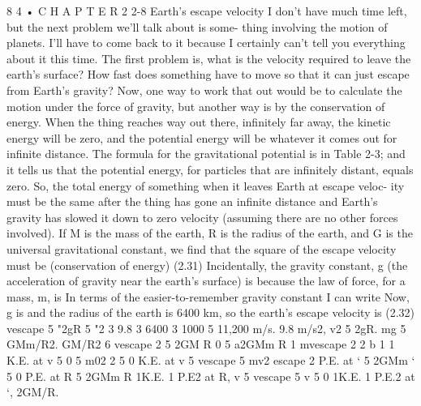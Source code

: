 \documentclass[10pt,oneside]{article}
\begin{document}
8 4 • C H A P T E R  2 2-8 Earth’s escape velocity I don’t have much time left, but the next problem we’ll talk about is some- thing involving the motion of planets. I’ll have to come back to it because I certainly can’t tell you everything about it this time. The first problem is, what is the velocity required to leave the earth’s surface? How fast does something have to move so that it can just escape from Earth’s gravity? Now, one way to work that out would be to calculate the motion under the force of gravity, but another way is by the conservation of energy. When the thing reaches way out there, infinitely far away, the kinetic energy will be zero, and the potential energy will be whatever it comes out for infinite distance. The formula for the gravitational potential is in Table 2-3; and it tells us that the potential energy, for particles that are infinitely distant, equals zero. So, the total energy of something when it leaves Earth at escape veloc- ity must be the same after the thing has gone an infinite distance and Earth’s gravity has slowed it down to zero velocity (assuming there are no other forces involved). If M is the mass of the earth, R is the radius of the earth, and G is the universal gravitational constant, we find that the square of the escape velocity must be (conservation of energy) (2.31) Incidentally, the gravity constant, g (the acceleration of gravity near the earth’s surface) is because the law of force, for a mass, m, is In terms of the easier-to-remember gravity constant I can write Now, g is and the radius of the earth is 6400 km, so the earth’s escape velocity is (2.32) vescape 5 "2gR 5 "2 3 9.8 3 6400 3 1000 5 11,200 m/s. 9.8 m/s2, v2 5 2gR. mg 5 GMm/R2. GM/R2 6 vescape 2 5 2GM R 0 5    a2GMm R 1 mvescape 2 2 b 1                  1 K.E. at v 5 0 5   m02 2   5 0   K.E. at v 5 vescape  5 mv2 escape 2 P.E. at ` 5 2GMm ` 5 0   P.E. at R 5 2GMm R 1K.E. 1 P.E2 at R, v 5 vescape 5 v 5 0 1K.E. 1 P.E.2 at `, 2GM/R.\par
\end{document}
